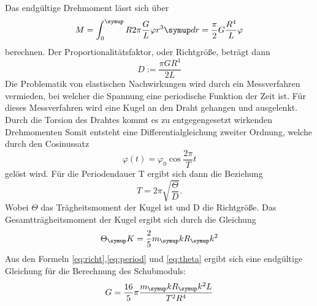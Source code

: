 Das endgültige Drehmoment lässt sich über
\begin{equation}
  M=\int_0^\su{R} 2\pi\frac{G}{L}\varphi r^3\su{dr}=\frac{\pi}{2}G\frac{R^4}
  {L}\varphi
  \label{eq:drehmoment}
\end{equation}
berechnen. Der Proportionalitätsfaktor, oder Richtgröße, beträgt dann
\begin{equation}
  D:=\frac{\pi GR^4}{2L}
  \label{eq:richt}
\end{equation}
Die Problematik von elastischen Nachwirkungen wird durch ein Messverfahren
vermieden, bei welcher die Spannung eine periodische Funktion der Zeit ist.
Für dieses Messverfahren wird eine Kugel an den Draht gehangen und ausgelenkt.
Durch die Torsion des Drahtes kommt es zu entgegengesetzt wirkenden Drehmomenten
Somit entsteht eine Differentialgleichung zweiter Ordnung, welche durch den
Cosinussatz
\begin{equation}
  \varphi(t)=\varphi_0\cos\frac{2\pi}{T}t
\end{equation}
gelöst wird. Für die Periodendauer T ergibt sich dann die Beziehung
\begin{equation}
  T=2\pi\sqrt{\frac{\Theta}{D}}.
  \label{eq:period}
\end{equation}
Wobei $\Theta$ das Trägheitsmoment der Kugel ist und D die Richtgröße.
Das Gesamtträgheitsmoment der Kugel ergibt sich durch die Gleichung
\begin{equation}
  \Theta_\su{K}=\frac{2}{5} m_\su{k}R_\su{k}^2
  \label{eq:theta}
\end{equation}
Aus den Formeln \eqref{eq:richt},\eqref{eq:period} und \eqref{eq:theta} ergibt sich
eine endgültige Gleichung für die Berechnung des Schubmoduls:
\begin{equation}
  G= \frac{16}{5}\pi\frac{m_\su{k}R_\su{k}^2L}{T^2R^4}
  \label{eq:schub}
\end{equation}
